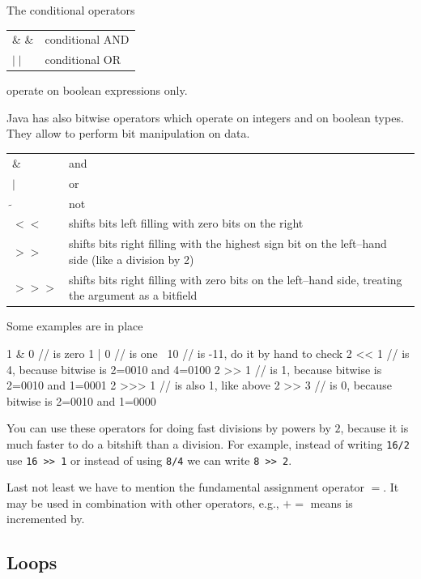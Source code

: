 The conditional operators
\begin{center}
\begin{tabular}{ll}
\& \& & conditional AND      \\
$\mid\mid$ & conditional OR
\end{tabular}
\end{center}
operate on  boolean expressions only.

Java has also bitwise operators which operate on integers and on
boolean types. They allow to perform bit manipulation on data.
\begin{center}
\begin{tabular}{lp{}}
\& & and \\
$\mid$ & or \\
$\tilde{}$ & not \\
$<<$ &  shifts bits left filling with zero bits on the right \\
$>>$ & shifts bits right filling with the highest sign bit on the
           left--hand side (like a division by 2)\\
$ >>>$ & shifts bits right filling with zero bits on the left--hand side, treating
    the argument as a bitfield
\end{tabular}
\end{center}
Some examples are in place
\begin{sverbatim}
 1 & 0   // is zero
 1 | 0   // is one
 ~10     // is -11, do it by hand to check
 2 << 1   // is 4, because bitwise is 2=0010 and 4=0100
 2 >> 1   // is 1, because bitwise is 2=0010 and 1=0001
 2 >>> 1  // is also 1, like above
 2 >> 3   // is 0, because bitwise is 2=0010 and 1=0000
\end{sverbatim}
You can use these operators for doing fast divisions by powers by $2$, 
because it is much
faster to do a bitshift than a division. For example, instead of
writing \verb|16/2| use \verb|16 >> 1| or instead of using \verb|8/4|
we can write \verb|8 >> 2|. 

Last not least we have to mention the fundamental assignment operator
$=$. It may be used in combination with other operators, e.g., $+=$
means is incremented by.


\subsection{Loops}
